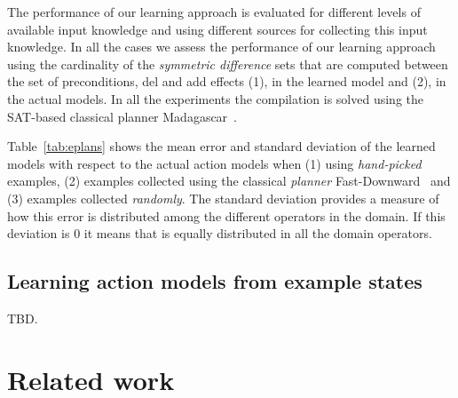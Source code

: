 \documentclass[letterpaper]{article} %
\begin{document}
The performance of our learning approach is evaluated for different levels of available input knowledge and using different sources for collecting this input knowledge. In all the cases we assess the performance of our learning approach using the cardinality of the {\em symmetric difference} sets that are computed between the set of preconditions, del and add effects (1), in the learned model and (2), in the actual models. In all the experiments the compilation is solved using the SAT-based classical planner {\sc Madagascar}~\cite{rintanen2014madagascar}.

Table~\ref{tab:eplans} shows the mean error and standard deviation of the learned models with respect to the actual action models when (1) using {\em hand-picked} examples, (2) examples collected using the classical {\em planner} {\sc Fast-Downward}~\cite{helmert2006fast} and (3) examples collected {\em randomly}. The standard deviation provides a measure of how this error is distributed among the different operators in the domain. If this deviation is 0 it means that is equally distributed in all the domain operators.


\subsection{Learning action models from example states}
TBD.


\section{Related work}
\end{document}
